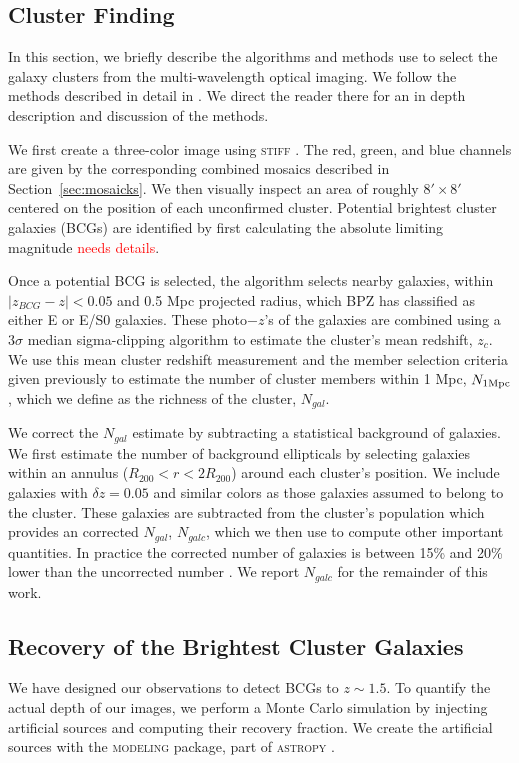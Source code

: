 \documentclass[apj, revtex4-1]{emulateapj}
\newcommand{\editorial}[1]{\textcolor{red}{#1}}
\begin{document}
\subsection{Cluster Finding}
In this section, we briefly describe the algorithms and methods use to select the galaxy clusters from the multi-wavelength optical imaging. We follow the methods described in detail in \cite{Menanteau2009a, Menanteau2010}. We direct the reader there for an in depth description and discussion of the methods.

We first create a three-color image using \textsc{stiff} \citep{Bertin2011}. The red, green, and blue channels are given by the corresponding combined mosaics described in Section~\ref{sec:mosaicks}. We then visually inspect an area of roughly $8' \times 8'$ centered on the position of each unconfirmed cluster. Potential brightest cluster galaxies (BCGs) are identified by first calculating the absolute limiting magnitude \editorial{needs details}.

Once a potential BCG is selected, the algorithm selects nearby galaxies, within $|z_{BCG} - z| < 0.05$ and 0.5 Mpc projected radius, which BPZ has classified as either E or E/S0 galaxies. These photo$-z$'s of the galaxies are combined using a $3\sigma$ median sigma-clipping algorithm to estimate the cluster's mean redshift, $z_c$. We use this mean cluster redshift measurement and the member selection criteria given previously to estimate the number of cluster members within 1 Mpc, $N_{1\rm Mpc}$, which we define as the richness of the cluster, $N_{gal}$.

We correct the $N_{gal}$ estimate by subtracting a statistical background of galaxies. We first estimate the number of background ellipticals by selecting galaxies within an annulus ($R_{200} <r < 2R_{200}$) around each cluster's position. We include galaxies with $\delta z = 0.05$ and similar colors as those galaxies assumed to belong to the cluster. These galaxies are subtracted from the cluster's population which provides an corrected $N_{gal}$, $N_{galc}$, which we then use to compute other important quantities. In practice the corrected number of galaxies is between 15\% and 20\% lower than the uncorrected number \citep{Menanteau2010}. We report $N_{galc}$ for the remainder of this work.

\subsection{Recovery of the Brightest Cluster Galaxies}
We have designed our observations to detect BCGs to $z\sim1.5$. To quantify the actual depth of our images, we perform a Monte Carlo simulation by injecting artificial sources and computing their recovery fraction. We create the artificial sources with the \textsc{modeling} package, part of \textsc{astropy} \citep{TheAstropyCollaboration2013}.
\end{document}
